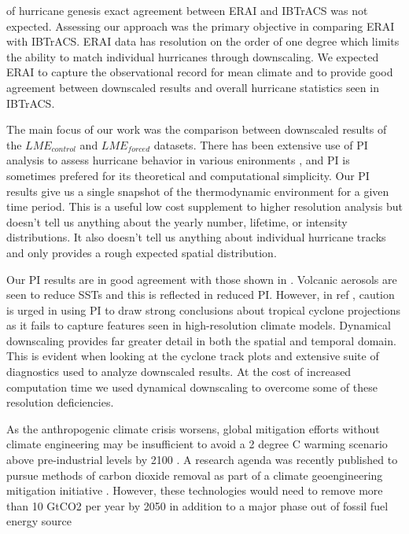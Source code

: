 \documentclass[smallextended]{svjour3}       %
\begin{document}
of hurricane genesis exact agreement between ERAI and IBTrACS was not expected. 
Assessing our approach was the primary objective in comparing ERAI with 
IBTrACS. ERAI data has resolution on the order of one degree which 
limits the ability to match individual hurricanes through downscaling. 
We expected ERAI to capture the observational record for mean climate 
and to provide good agreement between downscaled results and overall hurricane
statistics seen in IBTrACS.
\par
The main focus of our work was the comparison between downscaled results of the
$LME_{control}$ and $LME_{forced}$ datasets. There has been extensive use of 
PI analysis to assess hurricane behavior in various enironments 
\cite{yan2018divergent,ting2015,Kossin2009,vecchi2007effect}, and PI is sometimes 
prefered for its theoretical and computational simplicity. Our PI results give us a
single snapshot of the thermodynamic environment for a given time period. This
is a useful low cost supplement to higher resolution analysis but
doesn't tell us anything about the yearly number, lifetime, or intensity 
distributions. It also doesn't tell us anything about individual hurricane
tracks and only provides a rough expected spatial distribution. 
\par
Our PI results are in good agreement with those shown in \cite{yan2018divergent,vecchi2007effect}. Volcanic aerosols are seen to reduce SSTs and this is reflected
in reduced PI. However, in ref \cite{wehner2015}, caution is urged in using PI 
to draw strong conclusions about tropical cyclone projections as it fails to 
capture features seen in high-resolution climate models. Dynamical 
downscaling provides far greater detail in both the spatial and temporal domain. 
This is evident when looking at the cyclone track plots and extensive suite of 
diagnostics used to analyze downscaled results. At the cost of increased 
computation time we used dynamical downscaling to overcome some of these 
resolution deficiencies. 
\par
As the anthropogenic climate crisis worsens, global mitigation efforts 
without climate engineering may be insufficient to avoid a 2 degree C 
warming scenario above pre-industrial levels by 2100 
\cite{intergovernmental2018global}. A research agenda was recently 
published to pursue methods of carbon dioxide removal as part of a climate 
geoengineering mitigation initiative \cite{national2018negative}.  However, 
these technologies would need to remove more than 10 GtCO2 per year by 2050 
in addition to a major phase out of fossil fuel energy source 
\end{document}

